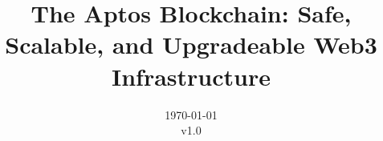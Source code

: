\documentclass{article}
\title{The Aptos Blockchain: Safe, Scalable, and Upgradeable Web3 Infrastructure}
\author{}
\date{\today\\v1.0}
\begin{document}
\maketitle

\end{document}
